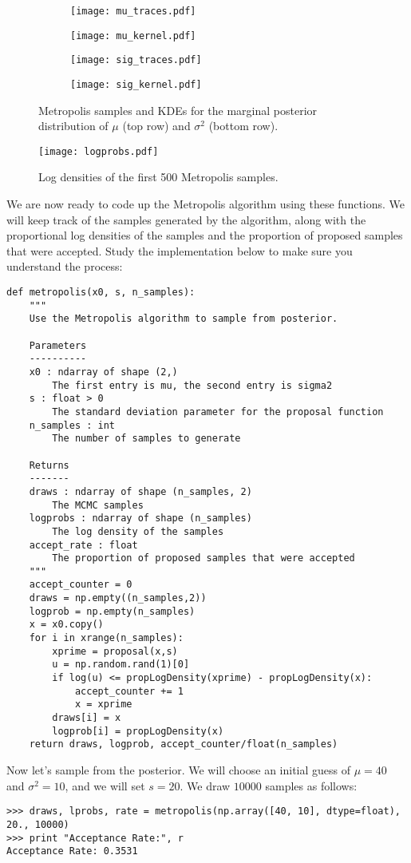 \begin{figure}
	\begin{subfigure}[b]{.49\textwidth}
		\centering
		\texttt{[image: mu\_traces.pdf]}
	\end{subfigure}
	\begin{subfigure}[b]{.49\textwidth}
		\centering
		\texttt{[image: mu\_kernel.pdf]}
	\end{subfigure}
	\begin{subfigure}[b]{.49\textwidth}
		\centering
		\texttt{[image: sig\_traces.pdf]}
	\end{subfigure}
	\begin{subfigure}[b]{.49\textwidth}
		\centering
		\texttt{[image: sig\_kernel.pdf]}
	\end{subfigure}
\caption{Metropolis samples and KDEs for the marginal posterior distribution of $\mu$ (top row) and $\sigma^2$ (bottom row).}
\label{fig:metropolis_results}
\end{figure}
\begin{figure}
\centering
\texttt{[image: logprobs.pdf]}
\caption{Log densities of the first 500 Metropolis samples.}
\label{fig:MH-logprobs}
\end{figure}
We are now ready to code up the Metropolis algorithm using these functions.
We will keep track of the samples generated by the algorithm, along with the proportional log densities of the
samples and the proportion of proposed samples that were accepted. Study the implementation below to make sure
you understand the process:
\begin{lstlisting}
def metropolis(x0, s, n_samples):
    """
    Use the Metropolis algorithm to sample from posterior.

    Parameters
    ----------
    x0 : ndarray of shape (2,)
        The first entry is mu, the second entry is sigma2
    s : float > 0
        The standard deviation parameter for the proposal function
    n_samples : int
        The number of samples to generate

    Returns
    -------
    draws : ndarray of shape (n_samples, 2)
        The MCMC samples
    logprobs : ndarray of shape (n_samples)
        The log density of the samples
    accept_rate : float
        The proportion of proposed samples that were accepted
    """
    accept_counter = 0
    draws = np.empty((n_samples,2))
    logprob = np.empty(n_samples)
    x = x0.copy()
    for i in xrange(n_samples):
        xprime = proposal(x,s)
        u = np.random.rand(1)[0]
        if log(u) <= propLogDensity(xprime) - propLogDensity(x):
            accept_counter += 1
            x = xprime
        draws[i] = x
        logprob[i] = propLogDensity(x)
    return draws, logprob, accept_counter/float(n_samples)
\end{lstlisting}
Now let's sample from the posterior. We will choose an initial guess of $\mu=40$ and $\sigma^2=10$,
and we will set $s = 20$. We draw $10000$ samples as follows:
\begin{lstlisting}
>>> draws, lprobs, rate = metropolis(np.array([40, 10], dtype=float), 20., 10000)
>>> print "Acceptance Rate:", r
Acceptance Rate: 0.3531
\end{lstlisting}

